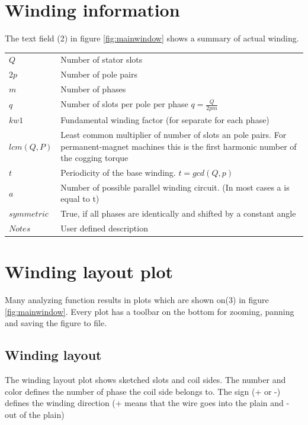 \documentclass[]{scrreprt}
\begin{document}
\section{Winding information}
The text field (2) in figure \ref{fig:mainwindow} shows a summary of actual winding. 
%
\begin{center}
\begin{table}[h]
\begin{tabularx}{\textwidth}{lX}
$Q$ & Number of stator slots \\
$2p$ & Number of pole pairs  \\
$m$ & Number of phases \\
$q$ & Number of slots per pole per phase $q=\frac{Q}{2pm}$ \\
$kw1$ & Fundamental winding factor (for separate for each phase) \\
$lcm(Q,P)$ & Least common multiplier of number of slots an pole pairs. For permanent-magnet machines this is the first harmonic  number of the cogging torque \\
$t$ & Periodicity of the base winding. $t = gcd(Q, p)$ \\
$a$ & Number of possible parallel winding circuit. (In most cases a is equal to t) \\
$symmetric$ & True, if all phases are identically and shifted by a constant angle \\
$Notes$ & User defined description \\
\end{tabularx}
\end{table}
\end{center}


%
%
%
%
\section{Winding layout plot}
Many analyzing function results in plots which are shown on(3) in figure \ref{fig:mainwindow}.
Every plot has a toolbar on the bottom for zooming, panning and saving the figure to file.
%
%
\subsection{Winding layout}
The winding layout plot shows sketched slots and coil sides. The number and color defines the number
of phase the coil side belongs to. The sign (+ or -) defines the winding direction (+ means that the
wire goes into the plain and - out of the plain)
%
%
\end{document}
